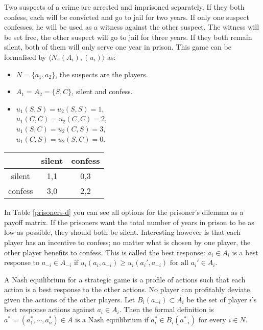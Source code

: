 Two suspects of a crime are arrested and imprisoned separately. If they both confess, each will be convicted and go to jail for two years. If only one suspect confesses, he will be used as a witness against the other suspect. The witness will be set free, the other suspect will go to jail for three years. If they both remain silent, both of them will only serve one year in prison. This game can be formalised by $\langle N, (A_i), (u_i) \rangle$ as:
\begin{itemize}
	\item $N = \{a_{1}, a_{2} \}$, the suspects are the players.
    \item $A_1 = A_2 = \{S, C\}$, silent and confess.
    \item $u_1(S, S) = u_2(S, S) = 1$, \\
    $u_1(C, C) = u_2(C, C) = 2$, \\
    $u_1(S, C) = u_2(C, S) = 3$, \\
    $u_1(C, S) = u_2(S, C) = 0$.

\end{itemize}

\begin{Float}
\centering
\begin{tabular}{|c|c|c|}
\hline
		& silent 	& confess 	\\
\hline
silent  & 1,1 		& 0,3 		\\ 
\hline
confess & 3,0 		& 2,2 		\\
\hline
\end{tabular}
\label{prisoners-d}
\end{Float}

In Table \ref{prisoners-d} you can see all options for the prisoner's dilemma as a payoff matrix. 
If the prisoners want the total number of years in prison to be as low as possible, they should both be silent. Interesting however is that each player has an incentive to confess; no matter what is chosen by one player, the other player benefits to confess. This is called the best response: $a_i \in A_i $ is a best response to $ a_{-i} \in A_{-i} $ if $u_i(a_i, a_{-i}) \geq u_i(a_{i}', a_{-i}) \mbox{ for all } a_{i}' \in A_i$.

A Nash equilibrium for a strategic game is a profile of actions such that each action is a best response to the other actions. No player can profitably deviate, given the actions of the other players. Let $B_i(a_{-i}) \subset A_i$ be the set of player $i$'s best response actions against $a_i \in A_i$. Then the formal definition is
$a^* = (a^*_1, \cdots, a^*_n) \in A \mbox{ is a Nash equilibrium if }
	a^*_i \in B_i(a_{-i}^*) \mbox{ for every } i \in N$.

